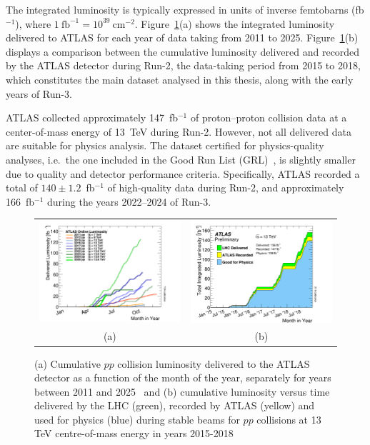 The integrated luminosity is typically expressed in units of inverse femtobarns (fb$^{-1}$), where $1~\text{fb}^{-1} = 10^{39}~\text{cm}^{-2}$. Figure~\ref{figure:Run3lumi}(a) shows the integrated luminosity delivered to ATLAS for each year of data taking from 2011 to 2025. Figure~\ref{figure:Run3lumi}(b) displays a comparison between the cumulative luminosity delivered and recorded by the ATLAS detector during Run-2, the data-taking period from 2015 to 2018, which constitutes the main dataset analysed in this thesis, along with the early years of Run-3.

ATLAS collected approximately 147~fb$^{-1}$ of proton--proton collision data at a center-of-mass energy of 13~TeV during Run-2. However, not all delivered data are suitable for physics analysis. The dataset certified for physics-quality analyses, i.e.\ the one included in the Good Run List (GRL)~\cite{Aad_2020}, is slightly smaller due to quality and detector performance criteria. Specifically, ATLAS recorded a total of $140 \pm 1.2$~fb$^{-1}$ of high-quality data during Run-2, and approximately 166~fb$^{-1}$ during the years 2022--2024 of Run-3.

\begin{figure}[htbp]
\centering
\begin{tabular}{cc}
    \includegraphics[width=0.5\linewidth]{images/intlumivsyear.png} &
    \includegraphics[width=0.5\linewidth]{images/intlumivstimeRun2DQall.png} \\
    (a) & (b)  \\
\end{tabular}
\caption{(a) Cumulative $pp$ collision luminosity delivered to the ATLAS detector as a function of the month
of the year, separately for years between 2011 and 2025~\cite{atlas:Run3lumi} and (b) cumulative luminosity versus
time delivered by the LHC (green), recorded by ATLAS (yellow) and used for physics (blue)
during stable beams for $pp$ collisions at 13 TeV centre-of-mass energy in years 2015-2018~\cite{atlas:Run2lumi}}
\label{figure:Run3lumi}
\end{figure}


